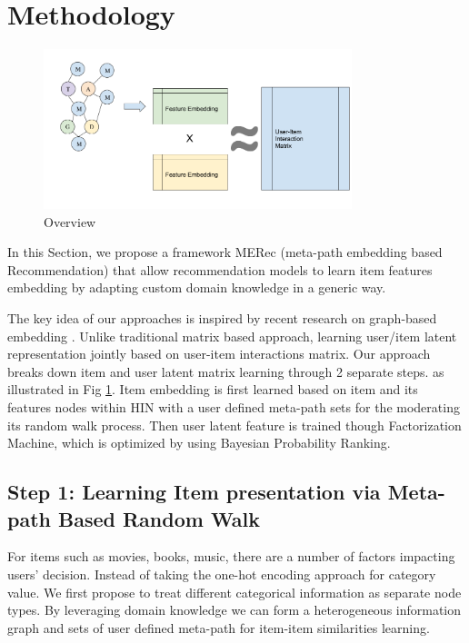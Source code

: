 \section{Methodology}

\begin{figure}[!t]
    \centering
    \includegraphics[width=0.8\textwidth]{figs/fig0.png}
    \caption{Overview}\label{fig:fe-overview}
\end{figure}

In this Section, we propose a framework MERec (meta-path embedding based Recommendation) that allow recommendation models to learn item features embedding by adapting custom domain knowledge in a generic way. 

The key idea of our approaches is inspired by recent research on graph-based embedding \cite{dong2017metapath2vec}. Unlike traditional matrix based approach, learning user/item latent representation jointly based on user-item interactions matrix. Our approach breaks down item and user latent matrix learning through 2 separate steps. as illustrated in Fig \ref{fig:fe-overview}. Item embedding is first learned based on item and its features nodes within HIN with a user defined meta-path sets for the moderating its random walk process. Then user latent feature is trained though Factorization Machine, which is optimized by using Bayesian Probability Ranking.

\subsection{Step 1: Learning Item presentation via Meta-path Based Random Walk}\label{3MF}

For items such as movies, books, music, there are a number of factors impacting users' decision. Instead of taking the one-hot encoding approach for category value. We first propose to treat different categorical information as separate node types. 
By leveraging domain knowledge we can form a heterogeneous information graph and sets of user defined meta-path for item-item similarities learning. 


